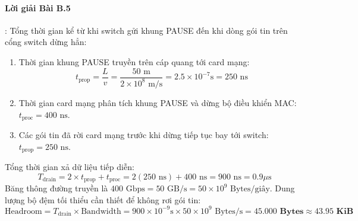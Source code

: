 \paragraph{Lời giải Bài B.5}:
Tổng thời gian kể từ khi switch gửi khung PAUSE đến khi dòng gói tin trên cổng switch dừng hẳn:
\begin{enumerate}
  \item Thời gian khung PAUSE truyền trên cáp quang tới card mạng:
  \begin{equation*}
  t_{\text{prop}} = \frac{L}{v} = \frac{50\text{ m}}{2 \times 10^8\text{ m/s}} = 2.5 \times 10^{-7}\text{s} = 250\text{ ns}
  \end{equation*}
  \item Thời gian card mạng phân tích khung PAUSE và dừng bộ điều khiển MAC: $t_{\text{proc}} = 400\text{ ns}$.
  \item Các gói tin đã rời card mạng trước khi dừng tiếp tục bay tới switch: $t_{\text{prop}} = 250\text{ ns}$.
\end{enumerate}
Tổng thời gian xả dữ liệu tiếp diễn:
\begin{equation*}
T_{\text{drain}} = 2 \times t_{\text{prop}} + t_{\text{proc}} = 2(250\text{ ns}) + 400\text{ ns} = 900\text{ ns} = 0.9\mu\text{s}
\end{equation*}
Băng thông đường truyền là $400\text{ Gbps} = 50\text{ GB/s} = 50 \times 10^9\text{ Bytes/giây}$.
Dung lượng bộ đệm tối thiểu cần thiết để không rơi gói tin:
\begin{equation*}
\text{Headroom} = T_{\text{drain}} \times \text{Bandwidth} = 900 \times 10^{-9}\text{s} \times 50 \times 10^9\text{ Bytes/s} = \mathbf{45.000\text{ Bytes}} \approx \mathbf{43.95\text{ KiB}}
\end{equation*}

